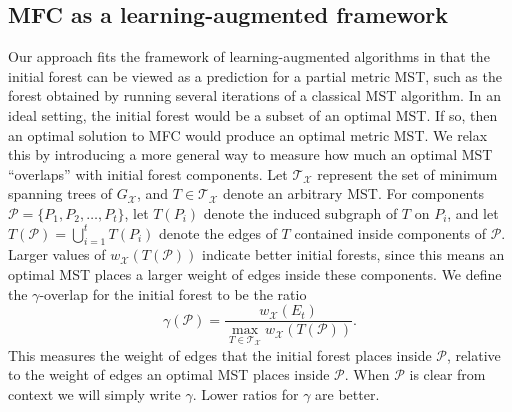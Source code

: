 \subsection{MFC as a learning-augmented framework}
\label{sec:learningaugmented}
Our approach fits the framework of learning-augmented algorithms in that the initial forest can be viewed as a prediction for a partial metric MST, such as the forest obtained by running several iterations of a classical MST algorithm. 
In an ideal setting, the initial forest would be a subset of an optimal MST. If so, then an optimal solution to MFC would produce an optimal metric MST. We relax this by introducing a more general way to measure how much an optimal MST ``overlaps'' with initial forest components. 
Let $\mathcal{T}_\mathcal{X}$ represent the set of minimum spanning trees of $G_\mathcal{X}$, and $T \in \mathcal{T}_\mathcal{X}$ denote an arbitrary MST.
For components $\mathcal{P} =  \{P_1, P_2, \hdots, P_t\}$, let $T(P_i)$ denote the induced subgraph of $T$ on $P_i$, and let $T(\mathcal{P}) = \bigcup_{i = 1}^t T(P_i)$ denote the edges of $T$ contained inside components of $\mathcal{P}$. 
Larger values of $w_\mathcal{X}(T(\mathcal{P}))$ indicate better initial forests, since this means an optimal MST places a larger weight of edges inside these components. 
We define the $\gamma$-overlap for the initial forest to be the ratio
\begin{equation}
\label{eq:gamma}
\gamma(\mathcal{P})  = \frac{w_\mathcal{X}(E_t)}{\max_{T \in \mathcal{T}_\mathcal{X}} w_\mathcal{X}(T(\mathcal{P}))}.
\end{equation}
This measures the weight of edges that the initial forest places inside $\mathcal{P}$, relative to the weight of edges an optimal MST places inside $\mathcal{P}$. 
When $\mathcal{P}$ is clear from context we will simply write $\gamma$. 
Lower ratios for $\gamma$ are better. 
